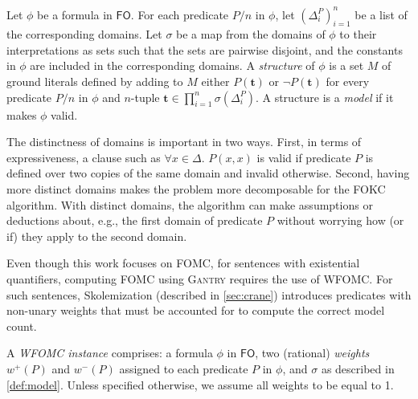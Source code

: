\documentclass[a4paper,UKenglish,cleveref, autoref, thm-restate]{lipics-v2021}
\newcommand{\FO}{$\mathsf{FO}$}
\newcommand{\Cranetwo}{\textsc{Gantry}}
\begin{document}

\begin{definition}[Model]\label{def:model}
  Let $\phi$ be a formula in \FO{}. For each predicate $P/n$ in $\phi$, let
  ${(\Delta_{i}^{P})}_{i=1}^{n}$ be a list of the corresponding domains. Let
  $\sigma$ be a map from the domains of $\phi$ to their interpretations as sets
  such that the sets are pairwise disjoint, and the constants in $\phi$ are
  included in the corresponding domains. A \emph{structure} of $\phi$ is a set
  $M$ of ground literals defined by adding to $M$ either $P(\mathbf{t})$ or
  $\neg P(\mathbf{t})$ for every predicate $P/n$ in $\phi$ and $n$-tuple
  $\mathbf{t} \in \prod_{i=1}^{n} \sigma(\Delta_{i}^{P})$. A structure is a
  \emph{model} if it makes $\phi$ valid.
\end{definition}

\begin{remark*}
  The distinctness of domains is important in two ways. First, in terms of
  expressiveness, a clause such as $\forall x \in \Delta\text{. }P(x, x)$ is
  valid if predicate $P$ is defined over two copies of the same domain and
  invalid otherwise. Second, having more distinct domains makes the problem more
  decomposable for the FOKC algorithm. With distinct domains, the algorithm can
  make assumptions or deductions about, e.g., the first domain of predicate $P$
  without worrying how (or if) they apply to the second domain.
\end{remark*}

\begin{remark*}
  Even though this work focuses on FOMC, for sentences with existential
  quantifiers, computing FOMC using \Cranetwo{} requires the use of WFOMC. For
  such sentences, Skolemization (described in \cref{sec:crane}) introduces
  predicates with non-unary weights that must be accounted for to compute the
  correct model count.
\end{remark*}

\begin{definition}\label{def:instance}
  A \emph{WFOMC instance} comprises: a formula $\phi$ in \FO{}, two (rational)
  \emph{weights} $w^{+}(P)$ and $w^{-}(P)$ assigned to each predicate $P$ in
  $\phi$, and $\sigma$ as described in \cref{def:model}. Unless specified
  otherwise, we assume all weights to be equal to 1.
\end{definition}
\end{document}
